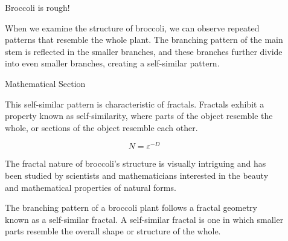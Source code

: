 \documentclass[]{beamer}
\begin{document}
\begin{frame}[t]
\begin{columns}[t]
\begin{column}{\onecolwid}
    \end{column} %
    
    \begin{column}{\sepwid}\end{column} %
    
    \begin{column}{\onecolwid} %
    
    
    
    \begin{alertblock}{Broccoli is rough!}
    
     When we examine the structure of broccoli, we can observe repeated patterns that resemble the whole plant. The branching pattern of the main stem is reflected in the smaller branches, and these branches further divide into even smaller branches, creating a self-similar pattern.
    
    \end{alertblock} 
    
    
    
    \begin{block}{Mathematical Section}
    
    This self-similar pattern is characteristic of fractals. Fractals exhibit a property known as self-similarity, where parts of the object resemble the whole, or sections of the object resemble each other. 
    
    $$
    N = \varepsilon^{-D}
    $$
    
    The fractal nature of broccoli's structure is visually intriguing and has been studied by scientists and mathematicians interested in the beauty and mathematical properties of natural forms. 
    
    The branching pattern of a broccoli plant follows a fractal geometry known as a self-similar fractal. A self-similar fractal is one in which smaller parts resemble the overall shape or structure of the whole.  
    \end{block}
   

\end{column}
\end{columns}
\end{frame}
\end{document}
